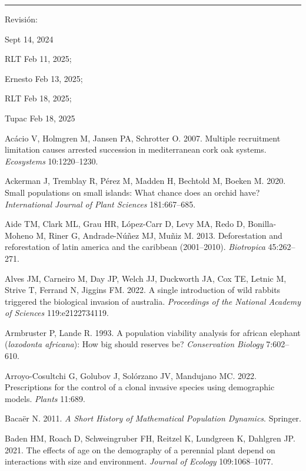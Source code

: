 \documentclass[
  12pt,
  letterpaper,
]{book}
\newlength{\cslhangindent}
\newenvironment{CSLReferences}[2] %
 {\begin{list}{}{%
  \setlength{\itemindent}{0pt}
  \setlength{\leftmargin}{0pt}
  \setlength{\parsep}{0pt}
  \ifodd #1
   \setlength{\leftmargin}{\cslhangindent}
   \setlength{\itemindent}{-1\cslhangindent}
  \fi
  \setlength{\itemsep}{#2\baselineskip}}}
 {\end{list}}
\begin{document}
\begin{center}\rule{0.5\linewidth}{0.5pt}\end{center}

Revisión:

Sept 14, 2024

RLT Feb 11, 2025;

Ernesto Feb 13, 2025;

RLT Feb 18, 2025;

Tupac Feb 18, 2025

\label{refs}
\begin{CSLReferences}{1}{0}
Acácio V, Holmgren M, Jansen PA, Schrotter O. 2007. Multiple recruitment
limitation causes arrested succession in mediterranean cork oak systems.
\emph{Ecosystems} 10:1220--1230.

Ackerman J, Tremblay R, Pérez M, Madden H, Bechtold M, Boeken M. 2020.
Small populations on small islands: What chance does an orchid have?
\emph{International Journal of Plant Sciences} 181:667--685.

Aide TM, Clark ML, Grau HR, López-Carr D, Levy MA, Redo D,
Bonilla-Moheno M, Riner G, Andrade-Núñez MJ, Muñiz M. 2013.
Deforestation and reforestation of latin america and the caribbean
(2001--2010). \emph{Biotropica} 45:262--271.

Alves JM, Carneiro M, Day JP, Welch JJ, Duckworth JA, Cox TE, Letnic M,
Strive T, Ferrand N, Jiggins FM. 2022. A single introduction of wild
rabbits triggered the biological invasion of australia.
\emph{Proceedings of the National Academy of Sciences} 119:e2122734119.

Armbruster P, Lande R. 1993. A population viability analysis for african
elephant (\emph{loxodonta {a}fricana}): How big should reserves be?
\emph{Conservation Biology} 7:602--610.

Arroyo-Cosultchi G, Golubov J, Solórzano JV, Mandujano MC. 2022.
Prescriptions for the control of a clonal invasive species using
demographic models. \emph{Plants} 11:689.

Bacaër N. 2011. \emph{A {S}hort {H}istory of {M}athematical {P}opulation
{D}ynamics}. Springer.

Baden HM, Roach D, Schweingruber FH, Reitzel K, Lundgreen K, Dahlgren
JP. 2021. The effects of age on the demography of a perennial plant
depend on interactions with size and environment. \emph{Journal of
Ecology} 109:1068--1077.


\end{CSLReferences}
\end{document}
